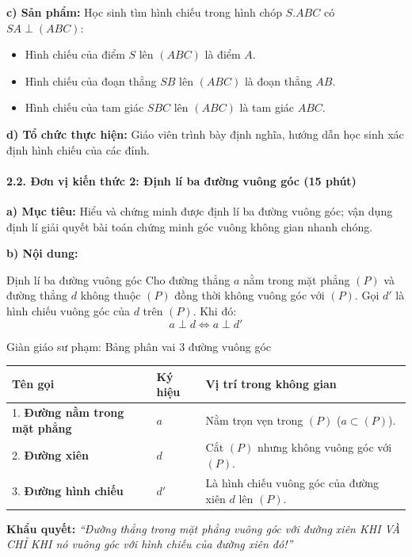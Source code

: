 \documentclass[12pt, a4paper]{article}
\begin{document}
\noindent \textbf{c) Sản phẩm:}
Học sinh tìm hình chiếu trong hình chóp $S.ABC$ có $SA \perp (ABC)$:
\begin{itemize}
    \item Hình chiếu của điểm $S$ lên $(ABC)$ là điểm $A$.
    \item Hình chiếu của đoạn thẳng $SB$ lên $(ABC)$ là đoạn thẳng $AB$.
    \item Hình chiếu của tam giác $SBC$ lên $(ABC)$ là tam giác $ABC$.
\end{itemize}

\noindent \textbf{d) Tổ chức thực hiện:}
Giáo viên trình bày định nghĩa, hướng dẫn học sinh xác định hình chiếu của các đỉnh.

\paragraph{2.2. Đơn vị kiến thức 2: Định lí ba đường vuông góc (15 phút)}

\noindent \textbf{a) Mục tiêu:}
Hiểu và chứng minh được định lí ba đường vuông góc; vận dụng định lí giải quyết bài toán chứng minh góc vuông không gian nhanh chóng.

\noindent \textbf{b) Nội dung:}
\begin{pedabox}{Định lí ba đường vuông góc}
Cho đường thẳng $a$ nằm trong mặt phẳng $(P)$ và đường thẳng $d$ không thuộc $(P)$ đồng thời không vuông góc với $(P)$. Gọi $d'$ là hình chiếu vuông góc của $d$ trên $(P)$. Khi đó:
$$a \perp d \iff a \perp d'$$
\end{pedabox}

\begin{scaffoldbox}{Giàn giáo sư phạm: Bảng phân vai 3 đường vuông góc}
\begin{center}
\begin{tabular}{|l|l|l|}
\hline
\textbf{Tên gọi} & \textbf{Ký hiệu} & \textbf{Vị trí trong không gian} \\ \hline
1. \textbf{Đường nằm trong mặt phẳng} & $a$ & Nằm trọn vẹn trong $(P)$ ($a \subset (P)$). \\ \hline
2. \textbf{Đường xiên} & $d$ & Cắt $(P)$ nhưng không vuông góc với $(P)$. \\ \hline
3. \textbf{Đường hình chiếu} & $d'$ & Là hình chiếu vuông góc của đường xiên $d$ lên $(P)$. \\ \hline
\end{tabular}
\end{center}
\textbf{Khẩu quyết:} \textit{``Đường thẳng trong mặt phẳng vuông góc với đường xiên KHI VÀ CHỈ KHI nó vuông góc với hình chiếu của đường xiên đó!''}
\end{scaffoldbox}
\end{document}
